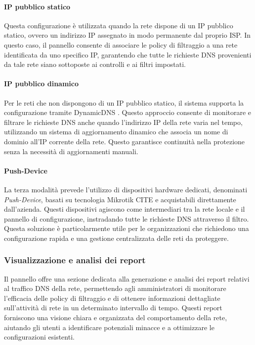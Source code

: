 \paragraph{IP pubblico statico}
Questa configurazione è utilizzata quando la rete dispone di un IP pubblico statico, ovvero un indirizzo IP assegnato in modo permanente dal proprio ISP. In questo caso, il pannello consente di associare le policy di filtraggio a una rete identificata da uno specifico IP, garantendo che tutte le richieste DNS provenienti da tale rete siano sottoposte ai controlli e ai filtri impostati.

\paragraph{IP pubblico dinamico}
Per le reti che non dispongono di un IP pubblico statico, il sistema supporta la configurazione tramite DynamicDNS \cite{rfc2136}. Questo approccio consente di monitorare e filtrare le richieste DNS anche quando l’indirizzo IP della rete varia nel tempo, utilizzando un sistema di aggiornamento dinamico che associa un nome di dominio all’IP corrente della rete. Questo garantisce continuità nella protezione senza la necessità di aggiornamenti manuali.

\paragraph{Push-Device}
La terza modalità prevede l’utilizzo di dispositivi hardware dedicati, denominati \textit{Push-Device}, basati su tecnologia Mikrotik CITE e acquistabili direttamente dall’azienda. Questi dispositivi agiscono come intermediari tra la rete locale e il pannello di configurazione, instradando tutte le richieste DNS attraverso il filtro. Questa soluzione è particolarmente utile per le organizzazioni che richiedono una configurazione rapida e una gestione centralizzata delle reti da proteggere.

\subsubsection{Visualizzazione e analisi dei report}
Il pannello offre una sezione dedicata alla generazione e analisi dei report relativi al traffico DNS della rete, permettendo agli amministratori di monitorare l’efficacia delle policy di filtraggio e di ottenere informazioni dettagliate sull’attività di rete in un determinato intervallo di tempo. Questi report forniscono una visione chiara e organizzata del comportamento della rete, aiutando gli utenti a identificare potenziali minacce e a ottimizzare le configurazioni esistenti.

